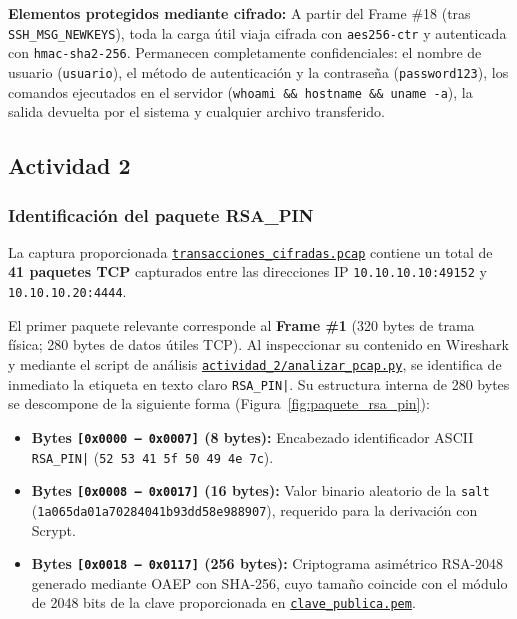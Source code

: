 \documentclass[letter,12pt]{article}
\begin{document}
\vspace{0.15cm}
\noindent\textbf{Elementos protegidos mediante cifrado:} A partir del Frame \#18 (tras \texttt{SSH\_MSG\_NEWKEYS}), toda la carga útil viaja cifrada con \texttt{aes256-ctr} y autenticada con \texttt{hmac-sha2-256}. Permanecen completamente confidenciales: el nombre de usuario (\texttt{usuario}), el método de autenticación y la contraseña (\texttt{password123}), los comandos ejecutados en el servidor (\texttt{whoami \&\& hostname \&\& uname -a}), la salida devuelta por el sistema y cualquier archivo transferido.

\clearpage
\subsection{Actividad 2}

\subsubsection{Identificación del paquete RSA\_PIN}

La captura proporcionada \href{https://github.com/minicoast/lab4-criptografia-udp/blob/main/transacciones_cifradas.pcap}{\texttt{transacciones\_cifradas.pcap}} contiene un total de \textbf{41 paquetes TCP} capturados entre las direcciones IP \texttt{10.10.10.10:49152} y \texttt{10.10.10.20:4444}.

El primer paquete relevante corresponde al \textbf{Frame \#1} (320 bytes de trama física; 280 bytes de datos útiles TCP). Al inspeccionar su contenido en Wireshark y mediante el script de análisis \href{https://github.com/minicoast/lab4-criptografia-udp/blob/main/actividad_2/analizar_pcap.py}{\texttt{actividad\_2/analizar\_pcap.py}}, se identifica de inmediato la etiqueta en texto claro \texttt{RSA\_PIN|}. Su estructura interna de 280 bytes se descompone de la siguiente forma (Figura~\ref{fig:paquete_rsa_pin}):

\begin{itemize}
    \item \textbf{Bytes \texttt{[0x0000 -- 0x0007]} (8 bytes):} Encabezado identificador ASCII \texttt{RSA\_PIN|} (\texttt{52 53 41 5f 50 49 4e 7c}).
    \item \textbf{Bytes \texttt{[0x0008 -- 0x0017]} (16 bytes):} Valor binario aleatorio de la \texttt{salt} (\texttt{1a065da01a70284041b93dd58e988907}), requerido para la derivación con Scrypt.
    \item \textbf{Bytes \texttt{[0x0018 -- 0x0117]} (256 bytes):} Criptograma asimétrico RSA-2048 generado mediante OAEP con SHA-256, cuyo tamaño coincide con el módulo de 2048 bits de la clave proporcionada en \href{https://github.com/minicoast/lab4-criptografia-udp/blob/main/clave_publica.pem}{\texttt{clave\_publica.pem}}.
\end{itemize}
\end{document}
